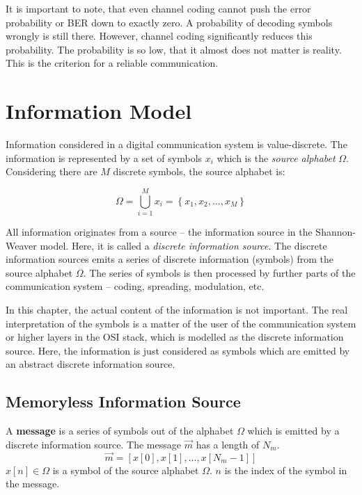 \begin{refsection}

It is important to note, that even channel coding cannot push the error probability or \ac{BER} down to exactly zero. A probability of decoding symbols wrongly is still there. However, channel coding significantly reduces this probability. The probability is so low, that it almost does not matter is reality. This is the criterion for a reliable communication.

\section{Information Model}

Information considered in a digital communication system is value-discrete. The information is represented by a set of symbols $x_i$ which is the  \emph{source alphabet} $\Omega$. Considering there are $M$ discrete symbols, the source alphabet is:

\begin{equation}
	\Omega = \bigcup\limits_{i = 1}^{M} x_i = \left\{x_1, x_2, \ldots, x_M\right\}
\end{equation}

All information originates from a source -- the information source in the Shannon-Weaver model. Here, it is called a  \emph{discrete information source}. The discrete information sources emits a series of discrete information (symbols) from the source alphabet $\Omega$. The series of symbols is then processed by further parts of the communication system -- coding, spreading, modulation, etc.

In this chapter, the actual content of the information is not important. The real interpretation of the symbols is a matter of the user of the communication system or higher layers in the \ac{OSI} stack, which is modelled as the discrete information source. Here, the information is just considered as symbols which are emitted by an abstract discrete information source.

\subsection{Memoryless Information Source}

A  \textbf{message} is a series of symbols out of the alphabet $\Omega$ which is emitted by a discrete information source. The message $\vec{m}$ has a length of $N_m$.
\begin{equation}
	\vec{m} = \left[x[0], x[1], \ldots, x[N_m-1]\right]
\end{equation}
$x[n] \in \Omega$ is a symbol of the source alphabet $\Omega$. $n$ is the index of the symbol in the message.


\end{refsection}

